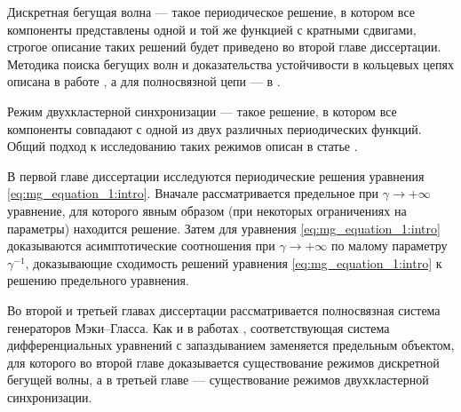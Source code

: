 Дискретная бегущая волна --- такое периодическое решение, в котором все компоненты представлены одной и той же функцией с кратными сдвигами, строгое описание таких решений будет приведено во второй главе диссертации. Методика поиска бегущих волн и доказательства устойчивости в кольцевых цепях описана в работе \cite{Glyzin2012}, а для полносвязной цепи --- в \cite{Glyzin2022a}.

Режим двухкластерной синхронизации --- такое решение, в котором все компоненты совпадают с одной из двух различных периодических функций. Общий подход к исследованию таких режимов описан в статье \cite{Glyzin2022}.

В первой главе диссертации исследуются периодические решения уравнения \eqref{eq:mg_equation_1:intro}. Вначале рассматривается предельное при $\gamma \to +\infty$ уравнение, для которого явным образом (при некоторых ограничениях на параметры) находится решение. Затем для уравнения \eqref{eq:mg_equation_1:intro} доказываются асимптотические соотношения при $\gamma \to +\infty$ по малому параметру $\gamma^{-1}$, доказывающие сходимость решений уравнения \eqref{eq:mg_equation_1:intro} к решению предельного уравнения.

Во второй и третьей главах диссертации рассматривается полносвязная система генераторов Мэки--Гласса. Как и в работах \cite{Preobrazhenskaya2020, Preobrazhenskaya2021, Preobrazhenskaia2021, Krisztin2020}, соответствующая система дифференциальных уравнений с запаздыванием заменяется предельным объектом, для которого во второй главе доказывается существование режимов дискретной бегущей волны, а в третьей главе --- существование режимов двухкластерной синхронизации.





